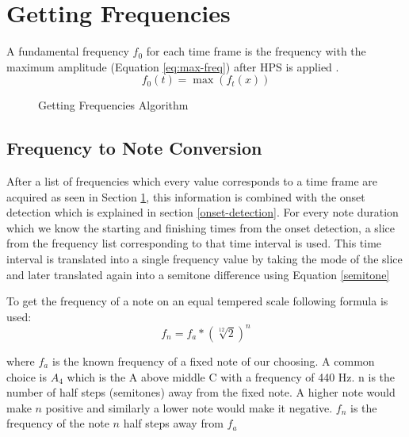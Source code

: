 \documentclass[a4paper,12pt]{report}
\begin{document}
\section{Getting Frequencies}
\label{frequencies}
A fundamental frequency $f_0$ for each time frame is the frequency with the maximum amplitude (Equation \ref{eq:max-freq}) after HPS is applied . 
\begin{equation}
\label{eq:max-freq}
f_0(t) = \max(f_t(x))
\end{equation}

\begin{figure}[htbp]
\begin{center}
\end{center}
\caption[Getting Frequencies Algorithm]{Getting Frequencies Algorithm}
\label{alg:freq}
\end{figure}

\subsection{Frequency to Note Conversion}
After a list of frequencies which every value corresponds to a time frame are acquired as seen in Section \ref{frequencies}, this information is combined with the onset detection which is explained in section \ref{onset-detection}. For every note duration which we know the starting and finishing times from the onset detection, a slice from the frequency list corresponding to that time interval is used. This time interval is translated into a single frequency value by taking the mode of the slice and later translated again into a semitone difference using Equation \ref{semitone}

To get the frequency of a note \cite{url:1} on an equal tempered scale following formula is used:
\begin{equation}
\label{eq:fixednote}
f_n = f_a*(\sqrt[12]{2})^n
\end{equation}

where $f_a$ is the known frequency of a fixed note of our choosing. A common choice is $A_4$ which is the A above middle C with a frequency of 440 Hz. n is the number of half steps (semitones) away from the fixed note. A higher note would make $n$ positive and similarly a lower note would make it negative. $f_n$ is the frequency of the note $n$ half steps away from $f_a$
\end{document}
